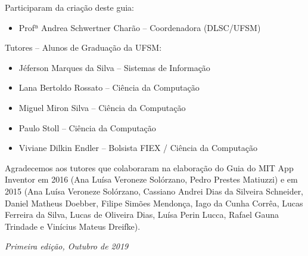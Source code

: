 \documentclass[11pt,fleqn]{book} %
\begin{document}
\vspace{1cm}
\noindent Participaram da criação deste guia:



\begin{itemize}
\item Profª Andrea Schwertner Charão -- Coordenadora (DLSC/UFSM)
\end{itemize}

\noindent Tutores -- Alunos de Graduação da UFSM:

\begin{itemize}

\item Jéferson Marques da Silva -- Sistemas de Informação
\item Lana Bertoldo Rossato -- Ciência da Computação
\item Miguel Miron Silva -- Ciência da Computação
\item Paulo Stoll -- Ciência da Computação
\item Viviane Dilkin Endler -- Bolsista FIEX / Ciência da Computação
\end{itemize}

\vspace{1cm}

\noindent Agradecemos aos tutores que colaboraram na elaboração do Guia do MIT App Inventor em 2016 (Ana Luísa Veroneze Solórzano, Pedro Prestes Matiuzzi) e em 2015 (Ana Luísa Veroneze Solórzano, Cassiano Andrei Dias da Silveira Schneider, Daniel Matheus Doebber, Filipe Simões Mendonça, Iago da Cunha Corrêa, Lucas Ferreira da Silva, Lucas de Oliveira Dias, Luísa Perin Lucca, Rafael Gauna Trindade e Vinícius Mateus Dreifke).


\vspace{1cm}

\noindent \textit{Primeira edição, Outubro de 2019} %

\vspace{1cm}

\cleardoublepage



\end{document}
